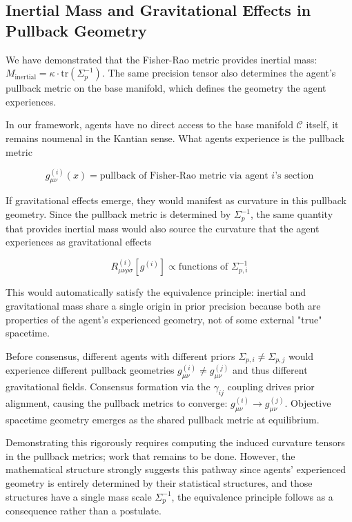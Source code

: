 \documentclass[11pt]{article}
\begin{document}
\subsection{Inertial Mass and Gravitational Effects in Pullback Geometry}

We have demonstrated that the Fisher-Rao metric provides inertial mass:
$M_{\text{inertial}} = \kappa \cdot \mathrm{tr}(\Sigma_p^{-1})$. The same precision tensor also determines the agent's pullback metric on the base manifold, which defines the geometry the agent experiences.

In our framework, agents have no direct access to the base manifold $\mathcal{C}$ itself, it remains noumenal in the Kantian sense. What agents experience is the pullback metric

\begin{equation}
g_{\mu\nu}^{(i)}(x) = \text{pullback of Fisher-Rao metric via agent } i\text{'s section}
\end{equation}

If gravitational effects emerge, they would manifest as curvature in this pullback geometry. Since the pullback metric is determined by $\Sigma_p^{-1}$, the same quantity that provides inertial mass would also source the curvature that the agent experiences as gravitational effects

\begin{equation}
R_{\mu\nu\rho\sigma}^{(i)}[g^{(i)}] \propto \text{functions of } \Sigma_{p,i}^{-1}
\end{equation}

This would automatically satisfy the equivalence principle: inertial and gravitational mass share a single origin in prior precision because both are properties of the agent's experienced geometry, not of some external "true" spacetime.

Before consensus, different agents with different priors $\Sigma_{p,i} \neq \Sigma_{p,j}$ would experience different pullback geometries $g^{(i)}_{\mu\nu} \neq g^{(j)}_{\mu\nu}$ and thus different gravitational fields. Consensus formation via the $\gamma_{ij}$ coupling drives prior alignment, causing the pullback metrics to converge: $g^{(i)}_{\mu\nu} \to g^{(j)}_{\mu\nu}$. Objective spacetime geometry emerges as the shared pullback metric at equilibrium.

Demonstrating this rigorously requires computing the induced curvature tensors in the pullback metrics; work that remains to be done. However, the mathematical structure strongly suggests this pathway since agents' experienced geometry is entirely determined by their statistical structures, and those structures have a single mass scale $\Sigma_p^{-1}$, the equivalence principle follows as a consequence rather than a postulate.
\end{document}
